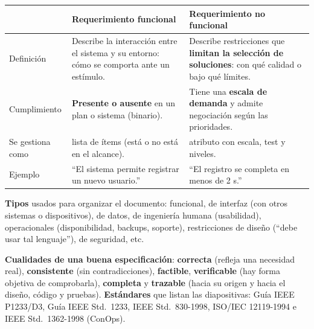 \documentclass[11pt,a4paper]{article}
\begin{document}
\begin{center}\small
\begin{tabularx}{\textwidth}{@{}l X X@{}}
\toprule
 & \textbf{Requerimiento funcional} & \textbf{Requerimiento no funcional}\\
\midrule
Definición & Describe la interacción entre el sistema y su entorno: cómo se comporta ante un estímulo. &
Describe restricciones que \textbf{limitan la selección de soluciones}: con qué calidad o bajo qué límites.\\
Cumplimiento & \textbf{Presente o ausente} en un plan o sistema (binario). & Tiene una \textbf{escala de
demanda} y admite negociación según las prioridades.\\
Se gestiona como & lista de ítems (está o no está en el alcance). & atributo con escala, test y niveles.\\
Ejemplo & ``El sistema permite registrar un nuevo usuario.'' & ``El registro se completa en menos de 2 s.''\\
\bottomrule
\end{tabularx}
\end{center}
\textbf{Tipos} usados para organizar el documento: funcional, de interfaz (con otros sistemas o dispositivos),
de datos, de ingeniería humana (usabilidad), operacionales (disponibilidad, backups, soporte), restricciones
de diseño (``debe usar tal lenguaje''), de seguridad, etc.

\textbf{Cualidades de una buena especificación}: \textbf{correcta} (refleja una necesidad real),
\textbf{consistente} (sin contradicciones), \textbf{factible}, \textbf{verificable} (hay forma objetiva de
comprobarla), \textbf{completa} y \textbf{trazable} (hacia su origen y hacia el diseño, código y pruebas).
\textbf{Estándares} que listan las diapositivas: Guía IEEE P1233/D3, Guía IEEE Std.\ 1233, IEEE Std.\ 830-1998,
ISO/IEC 12119-1994 e IEEE Std.\ 1362-1998 (ConOps).
\end{document}
